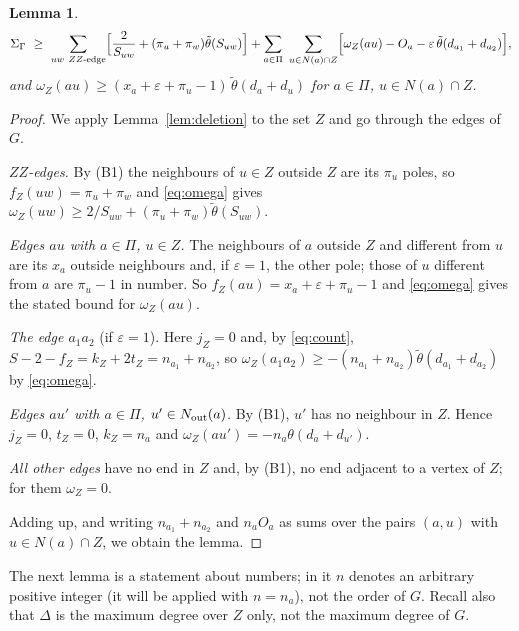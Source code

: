 \documentclass[11pt]{article}
\newtheorem{lemma}[theorem]{Lemma}
\theoremstyle{definition}
\theoremstyle{remark}
\newcommand{\tht}{\theta}
\newcommand{\tth}{\tilde\theta}
\begin{document}
\begin{lemma}\label{lem:lower}
\[
 \Sigma_\Gamma\ \ge\ \sum_{uw\ ZZ\text{-edge}}\Bigl[\frac{2}{S_{uw}}+(\pi_u+\pi_w)\tth(S_{uw})\Bigr]
 +\sum_{a\in\Pi}\ \sum_{u\in N(a)\cap Z}\Bigl[\omega_Z(au)-O_a-\varepsilon\,\tth(d_{a_1}+d_{a_2})\Bigr],
\]
and $\omega_Z(au)\ge(x_a+\varepsilon+\pi_u-1)\,\tth(d_a+d_u)$ for $a\in\Pi$, $u\in N(a)\cap Z$.
\end{lemma}
\begin{proof}
We apply Lemma~\ref{lem:deletion} to the set $Z$ and go through the edges of $G$.

\emph{$ZZ$-edges.} By (B1) the neighbours of $u\in Z$ outside $Z$ are its $\pi_u$ poles, so
$f_Z(uw)=\pi_u+\pi_w$ and \eqref{eq:omega} gives $\omega_Z(uw)\ge 2/S_{uw}+(\pi_u+\pi_w)\tth(S_{uw})$.

\emph{Edges $au$ with $a\in\Pi$, $u\in Z$.} The neighbours of $a$ outside $Z$ and different from
$u$ are its $x_a$ outside neighbours and, if $\varepsilon=1$, the other pole; those of $u$
different from $a$ are $\pi_u-1$ in number. So $f_Z(au)=x_a+\varepsilon+\pi_u-1$ and
\eqref{eq:omega} gives the stated bound for $\omega_Z(au)$.

\emph{The edge $a_1a_2$} (if $\varepsilon=1$). Here $j_Z=0$ and, by \eqref{eq:count},
$S-2-f_Z=k_Z+2t_Z=n_{a_1}+n_{a_2}$, so
$\omega_Z(a_1a_2)\ge-(n_{a_1}+n_{a_2})\tth(d_{a_1}+d_{a_2})$ by \eqref{eq:omega}.

\emph{Edges $au'$ with $a\in\Pi$, $u'\in N_{\rm out}(a)$.} By (B1), $u'$ has no neighbour in
$Z$. Hence $j_Z=0$, $t_Z=0$, $k_Z=n_a$ and $\omega_Z(au')=-n_a\tht(d_a+d_{u'})$.

\emph{All other edges} have no end in $Z$ and, by (B1), no end adjacent to a vertex of $Z$;
for them $\omega_Z=0$.

Adding up, and writing $n_{a_1}+n_{a_2}$ and $n_aO_a$ as sums over the pairs $(a,u)$ with
$u\in N(a)\cap Z$, we obtain the lemma.
\end{proof}

The next lemma is a statement about numbers; in it $n$ denotes an arbitrary positive integer
(it will be applied with $n=n_a$), not the order of $G$. Recall also that $\Delta$ is the
maximum degree over $Z$ only, not the maximum degree of $G$.
\end{document}
